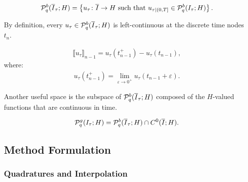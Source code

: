 \begin{definition}
    \begin{align}
        \mathcal{P}_{q}^b(\overline{I}_{\tau}; H) = \left\{ u_{\tau} \colon \overline{I} \rightarrow H \text{ such that } u_{\tau \mid (0, T]} \in \mathcal{P}_{q}^b(I_{\tau}; H) \right\}.
    \end{align}
\end{definition}


By definition, every $u_{\tau} \in \mathcal{P}_{q}^b(\overline{I}_{\tau}; H)$ is left-continuous at the discrete time nodes $t_n$.

\begin{definition}
    \begin{align}
        \llbracket u_{\tau} \rrbracket_{n - 1} = u_{\tau}(t_{n - 1}^+) - u_{\tau}(t_{n - 1}),
    \end{align}
    where:
    \begin{align}
        u_{\tau}(t_{n - 1}^+) = \lim_{\varepsilon \rightarrow 0^+} u_{\tau}(t_{n - 1} + \varepsilon).
    \end{align}
\end{definition}

Another useful space is the subspace of $\mathcal{P}_{q}^b(\overline{I}_{\tau}; H)$ composed of the $H$-valued functions that are continuous in time.

\begin{definition}
    \begin{align}
        \mathcal{P}_{q}^g(I_{\tau}; H) = \mathcal{P}_{q}^b(\overline{I}_{\tau}; H) \cap C^0(\overline{I}; H).
    \end{align}
\end{definition}

\newpage
\subsection{Method Formulation}

\subsubsection{Quadratures and Interpolation}

